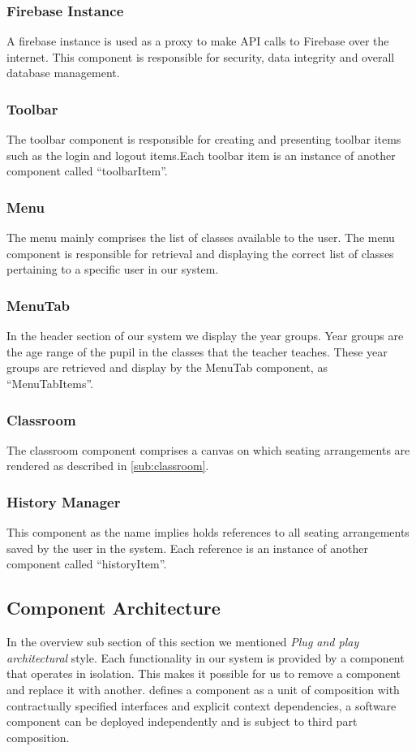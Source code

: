 \subsubsection{Firebase Instance} \label{sub:firebase}
A firebase instance is used as a proxy to make API calls to Firebase over the internet. This component is responsible for security, data integrity and overall database management.

\subsubsection{Toolbar}
The toolbar component is responsible for creating and presenting toolbar items such as the login and logout items.Each toolbar item is an instance of another component called ``toolbarItem''.

\subsubsection{Menu}
The menu mainly comprises the list of classes available to the user. The menu component is responsible for retrieval and displaying the correct list of classes pertaining to a specific user in our system.

\subsubsection{MenuTab}
In the header section of our system we display the year groups. Year groups are the age range of the pupil in the classes that the teacher teaches. These year groups are retrieved and display by the MenuTab component, as ``MenuTabItems''.

\subsubsection{Classroom}
The classroom component comprises a canvas on which seating arrangements are rendered as described in \ref{sub:classroom}. 

\subsubsection{History Manager} \label{sub:historyManager}
This component as the name implies holds references to all seating arrangements saved by the user in the system. Each reference is an instance of another component called ``historyItem''. 

\subsection{Component Architecture}
In the overview sub section of this section we mentioned \emph{Plug and play architectural} style. Each functionality in our system is provided by a component that operates in isolation. This makes it possible for us to remove a component and replace it with another. \cite{clemens1998component} defines a component as a unit of composition with contractually specified interfaces and explicit context dependencies, a software component can be deployed independently and is subject to third part composition.
